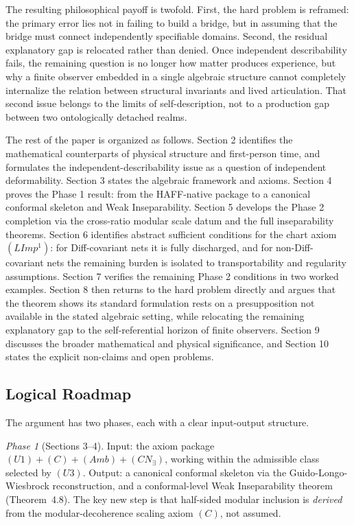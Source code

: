\documentclass[12pt]{article}
\theoremstyle{definition}
\theoremstyle{remark}
\begin{document}
The resulting philosophical payoff is twofold. First, the hard problem
is reframed: the primary error lies not in failing to build a bridge,
but in assuming that the bridge must connect independently specifiable
domains. Second, the residual explanatory gap is relocated rather than
denied. Once independent describability fails, the remaining question is
no longer how matter produces experience, but why a finite observer
embedded in a single algebraic structure cannot completely internalize
the relation between structural invariants and lived articulation. That
second issue belongs to the limits of self-description, not to a
production gap between two ontologically detached realms.

The rest of the paper is organized as follows. Section 2 identifies the
mathematical counterparts of physical structure and first-person time,
and formulates the independent-describability issue as a question of
independent deformability. Section 3 states the algebraic framework and
axioms. Section 4 proves the Phase 1 result: from the HAFF-native
package to a canonical conformal skeleton and Weak Inseparability.
Section 5 develops the Phase 2 completion via the cross-ratio
modular scale datum and the full inseparability theorems.
Section 6 identifies abstract sufficient conditions for the chart axiom
$(LImp^1)$: for Diff-covariant nets it is fully discharged, and for
non-Diff-covariant nets the remaining burden is isolated to
transportability and regularity assumptions.
Section 7 verifies the remaining Phase 2 conditions in two worked examples.
Section 8 then returns to
the hard problem directly and argues that the theorem shows its
standard formulation rests on a presupposition not available in the
stated algebraic setting, while relocating the remaining explanatory gap to
the self-referential horizon of finite observers. Section 9 discusses
the broader mathematical and physical significance, and Section 10 states
the explicit non-claims and open problems.

\subsection{Logical Roadmap}\label{subsec:roadmap}

The argument has two phases, each with a clear input-output structure.

\emph{Phase 1} (Sections 3--4). Input: the axiom package
\((U1)+(C)+(Amb)+(CN_\exists)\), working within the admissible class
selected by \((U3)\). Output: a canonical conformal skeleton via the
Guido-Longo-Wiesbrock reconstruction, and a conformal-level Weak
Inseparability theorem (Theorem~4.8). The key new step is that
half-sided modular inclusion is \emph{derived} from the
modular-decoherence scaling axiom \((C)\), not assumed.
\end{document}
